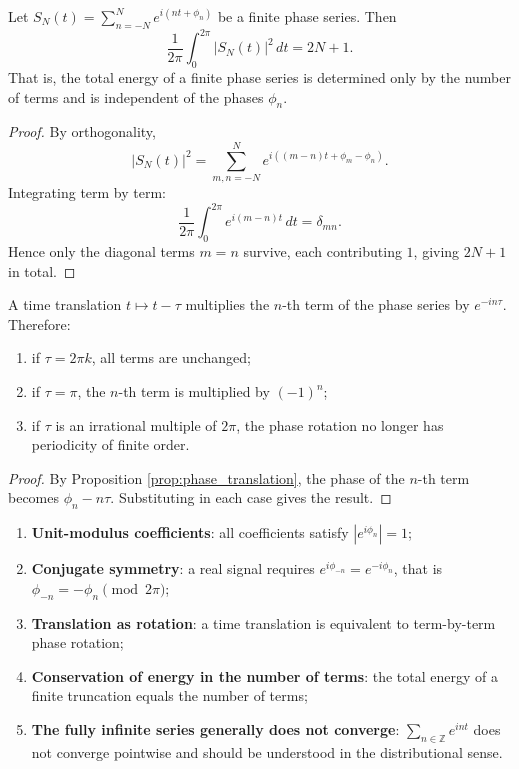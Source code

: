 \begin{theorem}\label{thm:phase_modulus_conservation}
Let $S_N(t)=\sum_{n=-N}^{N} e^{i(nt+\phi_n)}$ be a finite phase series. Then
\[
\frac{1}{2\pi}\int_0^{2\pi}|S_N(t)|^2\,dt = 2N+1.
\]
That is, the total energy of a finite phase series is determined only by the number of terms and is independent of the phases $\phi_n$.
\end{theorem}

\begin{proof}
By orthogonality,
\[
|S_N(t)|^2
= \sum_{m,n=-N}^{N} e^{i((m-n)t+\phi_m-\phi_n)}.
\]
Integrating term by term:
\[
\frac{1}{2\pi}\int_0^{2\pi} e^{i(m-n)t}\,dt = \delta_{mn}.
\]
Hence only the diagonal terms $m=n$ survive, each contributing $1$, giving $2N+1$ in total.
\end{proof}

\begin{corollary}\label{cor:phase_time_shift_rotation}
A time translation $t\mapsto t-\tau$ multiplies the $n$-th term of the phase series by $e^{-in\tau}$. Therefore:
\begin{enumerate}[label=(\roman*)]
    \item if $\tau=2\pi k$, all terms are unchanged;
    \item if $\tau=\pi$, the $n$-th term is multiplied by $(-1)^n$;
    \item if $\tau$ is an irrational multiple of $2\pi$, the phase rotation no longer has periodicity of finite order.
\end{enumerate}
\end{corollary}

\begin{proof}
By Proposition \ref{prop:phase_translation}, the phase of the $n$-th term becomes $\phi_n-n\tau$. Substituting in each case gives the result.
\end{proof}

\begin{property}\label{prop:phase_series_properties}
\begin{enumerate}[label=(\roman*)]
    \item \textbf{Unit-modulus coefficients}: all coefficients satisfy $|e^{i\phi_n}|=1$;
    \item \textbf{Conjugate symmetry}: a real signal requires $e^{i\phi_{-n}}=e^{-i\phi_n}$, that is $\phi_{-n}=-\phi_n \pmod{2\pi}$;
    \item \textbf{Translation as rotation}: a time translation is equivalent to term-by-term phase rotation;
    \item \textbf{Conservation of energy in the number of terms}: the total energy of a finite truncation equals the number of terms;
    \item \textbf{The fully infinite series generally does not converge}: $\sum_{n\in\mathbb{Z}}e^{int}$ does not converge pointwise and should be understood in the distributional sense.
\end{enumerate}
\end{property}

